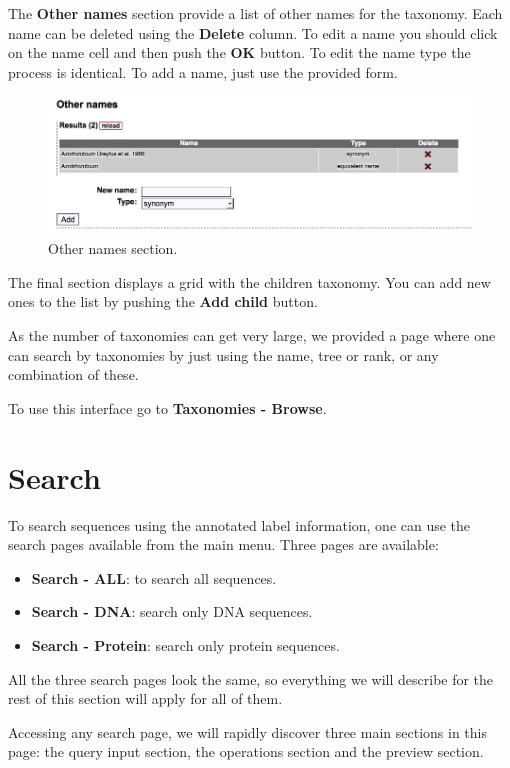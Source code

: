 The \textbf{Other names} section provide a list of other names for the taxonomy. Each name can be deleted
using the \textbf{Delete} column. To edit a name you should click on the name cell and then push the \textbf{OK}
button. To edit the name type the process is identical. To add a name, just use the provided form.

\begin{figure}[H]
  \centering
    \includegraphics[scale=0.4]{other_names.png}
  \caption{Other names section.}
  \label{fig:other_names}
\end{figure}

The final section displays a grid with the children taxonomy. You can add new ones to the list by pushing
the \textbf{Add child} button.

As the number of taxonomies can get very large, we provided a page where one can search by taxonomies
by just using the name, tree or rank, or any combination of these.

To use this interface go to \textbf{Taxonomies - Browse}.

\section{Search}

To search sequences using the annotated label information, one can use the search pages available
from the main menu. Three pages are available:

\begin{itemize}
  \item \textbf{Search - ALL}: to search all sequences.
  \item \textbf{Search - DNA}: search only DNA sequences.
  \item \textbf{Search - Protein}: search only protein sequences.
\end{itemize}

All the three search pages look the same, so everything we will describe for the rest
of this section will apply for all of them.

Accessing any search page, we will rapidly discover three main sections in this page:
the query input section, the operations section and the preview section.

